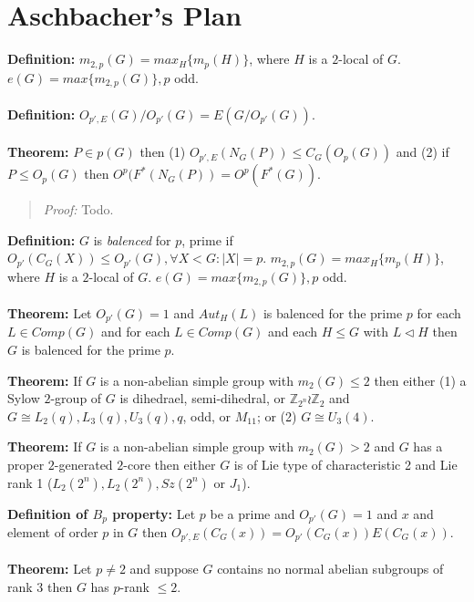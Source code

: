 \section{Aschbacher's Plan}
{\bf Definition:} $m_{2,p}(G)= max_H \{ m_p(H) \}$, where $H$ is a $2$-local of $G$.
$e(G)= max \{m_{2,p}(G) \}, p$ odd.
\\
\\
{\bf Definition:}
$O_{p', E}(G)/O_{p'}(G)= E(G/O_{p'}(G))$.
\\
\\
{\bf Theorem:} $P \in p(G)$ then (1) $O_{p', E}(N_G(P)) \le C_G(O_p(G))$ and
(2) if $P \le O_p(G)$ then $O^p(F^*(N_G(P))= O^p(F^*(G))$.
\begin{quote}
\emph{Proof:}  Todo.
\end{quote}
{\bf Definition:} $G$ is \emph{balenced} for $p$, prime if $O_{p'}(C_G(X)) \le O_{p'}(G), \forall X < G: |X|=p$.
$m_{2,p}(G)= max_H \{ m_p(H) \}$, where $H$ is a $2$-local of $G$.
$e(G)= max \{m_{2,p}(G) \}, p$ odd.
\\
\\
{\bf Theorem:} Let $O_{p'}(G)=1$ and $Aut_H(L)$ is balenced for the prime $p$ for each $L \in Comp(G)$ and for each $L \in Comp(G)$ and each $H \le G$ with $L \lhd H$
then $G$ is balenced for the prime $p$.
\begin{quote}
\end{quote}
{\bf Theorem:} If $G$ is a non-abelian simple group with $m_2(G) \le 2$ then either
(1) a Sylow $2$-group of $G$ is dihedrael, semi-dihedral, or
${\mathbb Z}_{2^n} \wr {\mathbb Z}_2$ and $G \cong L_2(q), L_3(q), U_3(q), q$, odd, or
$M_{11}$; or (2) $G \cong U_3(4)$.
\begin{quote}
\end{quote}
{\bf Theorem:} If $G$ is a non-abelian simple group with $m_2(G) > 2$  and
$G$ has a proper $2$-generated $2$-core then either $G$ is of Lie type of characteristic 2
and Lie rank 1 ($L_2(2^n), L_2(2^n), Sz(2^n)$ or $J_1$).
\begin{quote}
\end{quote}
{\bf Definition of $B_p$ property:}   Let $p$ be a prime and $O_{p'}(G)=1$ and $x$ and element of
order $p$ in $G$ then $O_{p',E}(C_G(x))= O_{p'}(C_G(x))E(C_G(x))$.
\\
\\
{\bf Theorem:}
Let $p \ne 2$ and suppose $G$ contains no normal abelian subgroups of rank $3$ then
$G$ has $p$-rank $\le 2$.
\begin{quote}
\end{quote}
